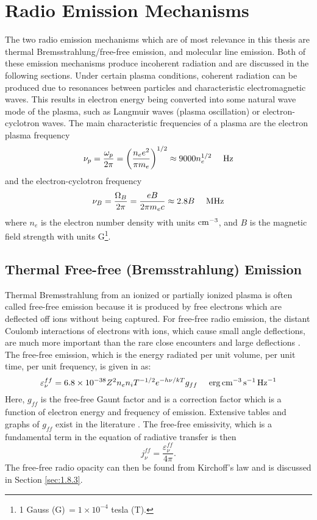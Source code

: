 \section{Radio Emission Mechanisms}\label{sec:1.7}
The two radio emission mechanisms which are of most relevance in this thesis are thermal Bremsstrahlung/free-free emission, and molecular line emission. Both of these emission mechanisms produce incoherent radiation and are discussed in the following sections. Under certain plasma conditions, coherent radiation can be produced due to resonances between particles and characteristic electromagnetic waves.  This results in electron energy being converted into some natural wave mode of the plasma, such as Langmuir waves (plasma oscillation) or electron-cyclotron waves. The main characteristic frequencies of a plasma are the electron plasma frequency
\begin{equation}
\nu _{p} = \frac{\omega _{p}}{2\pi}=\left( \frac{n_e e^2}{\pi m_e}\right)^{1/2} \approx 9000 n_e ^{1/2}\ \ \ \ \rm{Hz}
\end{equation}
and the electron-cyclotron frequency
\begin{equation}
\nu _{B}= \frac{\Omega _{B}}{2\pi}=\frac{eB}{2\pi m_e c} \approx 2.8B\ \ \ \ \rm{MHz}
\end{equation}
where $n_e$ is the electron number density with units $\rm{cm}^{-3}$, and $B$ is the magnetic field strength with units G\footnote{1 Gauss (G)\,$= 1\times 10^{-4}$ tesla (T).}. 

\subsection{Thermal Free-free (Bremsstrahlung) Emission}\label{sec:1.7.1}
Thermal Bremsstrahlung from an ionized or partially ionized plasma is often called free-free emission because it is produced by free electrons which are deflected off ions without being captured. For free-free radio emission, the distant Coulomb interactions of electrons with ions, which cause small angle deflections, are much more important than the rare close encounters and large deflections \citep{dulk_1985}. The free-free emission, which is the energy radiated per unit volume, per unit time, per unit frequency, is given in \cite{rybicki_1979} as:
\begin{equation}\label{eq:1.7.1}
\varepsilon _{\nu} ^{ff} = 6.8 \times 10^{-38}Z^{2}n_{e}n_{i}T^{-1/2}e^{-h\nu /kT}g_{ff}\ \ \ \ \rm{erg}\,\rm{cm}^{-3}\,s^{-1}\,\rm{Hz}^{-1}
\end{equation}
Here, $g_{ff}$ is the free-free Gaunt factor and is a correction factor which is a function of electron energy and frequency of emission. Extensive tables and graphs of $g_{ff}$ exist in the literature \citep[e.g.,][]{karzas_1961}. The free-free emissivity, which is a fundamental term in the equation of radiative transfer is then
\begin{equation}\label{eq:1.7.2a}
j_{\nu} ^{ff}=\frac{\varepsilon _{\nu} ^{ff}}{4\pi}.
\end{equation}
The free-free radio opacity can then be found from Kirchoff's law and is discussed in Section \ref{sec:1.8.3}.

